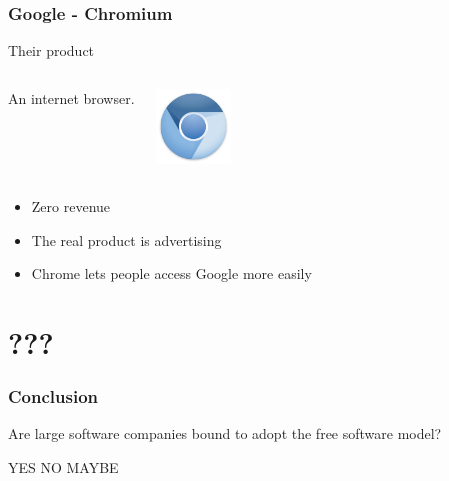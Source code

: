 \documentclass{beamer}
\begin{document}
\begin{frame}

  \frametitle{Google - Chromium}

  \begin{block}{Their product}
    \begin{columns}[c]

      An internet browser.

      \includegraphics[width=2cm]{logo_chromium.png}

    \end{columns}
  \end{block}

  \vfill

  \begin{itemize}
    \item<2->{Zero revenue}
    \item<3->{The real product is advertising}
    \item<4>{Chrome lets people access Google more easily}
  \end{itemize}

\end{frame}

\section{???}

\begin{frame}

  \frametitle{Conclusion}

  \begin{block}{}
    \begin{center}Are large software companies bound to adopt the free software
    model?\end{center}
  \end{block}

  YES NO MAYBE

\end{frame}
\end{document}
